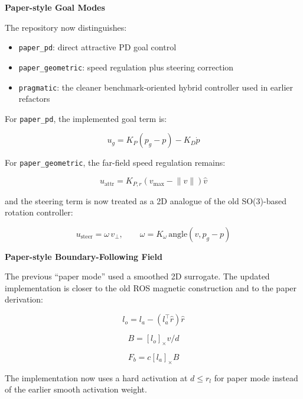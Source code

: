 \documentclass[11pt]{article}
\begin{document}
\textbf{Paper-style Goal Modes}

The repository now distinguishes:

\begin{itemize}[leftmargin=*]
  \item \texttt{paper\_pd}: direct attractive PD goal control
  \item \texttt{paper\_geometric}: speed regulation plus steering correction
  \item \texttt{pragmatic}: the cleaner benchmark-oriented hybrid controller used in earlier refactors
\end{itemize}

For \texttt{paper\_pd}, the implemented goal term is:

\begin{equation}
u_g = K_P (p_g - p) - K_D \dot{p}
\end{equation}

For \texttt{paper\_geometric}, the far-field speed regulation remains:

\begin{equation}
u_{\text{attr}} = K_{P,r} (v_{\max} - \lVert v \rVert)\hat{v}
\end{equation}

and the steering term is now treated as a 2D analogue of the old SO(3)-based
rotation controller:

\begin{equation}
u_{\text{steer}} = \omega \, v_{\perp},
\qquad
\omega = K_{\omega}\,\mathrm{angle}(v, p_g-p)
\end{equation}

\textbf{Paper-style Boundary-Following Field}

The previous ``paper mode'' used a smoothed 2D surrogate. The updated
implementation is closer to the old ROS magnetic construction and to the paper
derivation:

\begin{equation}
l_o = l_a - \left(l_a^\top \hat{r}\right)\hat{r}
\end{equation}

\begin{equation}
B = [l_o]_{\times} v / d
\end{equation}

\begin{equation}
F_b = c [l_a]_{\times} B
\end{equation}

The implementation now uses a hard activation at \(d \le r_l\) for paper mode
instead of the earlier smooth activation weight.
\end{document}
